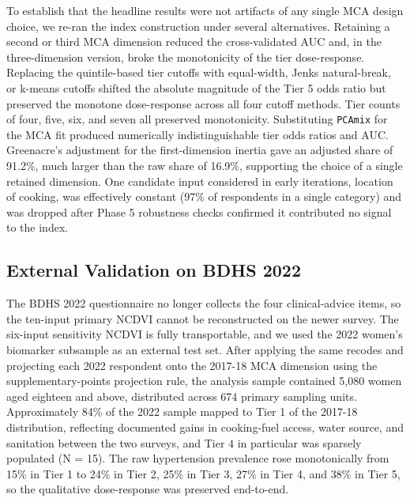 \documentclass[
  12pt,
  a4paper]{article}
\begin{document}
To establish that the headline results were not artifacts of any single MCA design choice, we re-ran the index construction under several alternatives. Retaining a second or third MCA dimension reduced the cross-validated AUC and, in the three-dimension version, broke the monotonicity of the tier dose-response. Replacing the quintile-based tier cutoffs with equal-width, Jenks natural-break, or k-means cutoffs shifted the absolute magnitude of the Tier 5 odds ratio but preserved the monotone dose-response across all four cutoff methods. Tier counts of four, five, six, and seven all preserved monotonicity. Substituting \texttt{PCAmix} for the MCA fit produced numerically indistinguishable tier odds ratios and AUC. Greenacre's adjustment for the first-dimension inertia gave an adjusted share of 91.2\%, much larger than the raw share of 16.9\%, supporting the choice of a single retained dimension. One candidate input considered in early iterations, location of cooking, was effectively constant (97\% of respondents in a single category) and was dropped after Phase 5 robustness checks confirmed it contributed no signal to the index.

\subsection{External Validation on BDHS 2022}\label{external-validation-on-bdhs-2022}

The BDHS 2022 questionnaire no longer collects the four clinical-advice items, so the ten-input primary NCDVI cannot be reconstructed on the newer survey. The six-input sensitivity NCDVI is fully transportable, and we used the 2022 women's biomarker subsample as an external test set. After applying the same recodes and projecting each 2022 respondent onto the 2017-18 MCA dimension using the supplementary-points projection rule, the analysis sample contained 5,080 women aged eighteen and above, distributed across 674 primary sampling units. Approximately 84\% of the 2022 sample mapped to Tier 1 of the 2017-18 distribution, reflecting documented gains in cooking-fuel access, water source, and sanitation between the two surveys, and Tier 4 in particular was sparsely populated (N = 15). The raw hypertension prevalence rose monotonically from 15\% in Tier 1 to 24\% in Tier 2, 25\% in Tier 3, 27\% in Tier 4, and 38\% in Tier 5, so the qualitative dose-response was preserved end-to-end.
\end{document}
